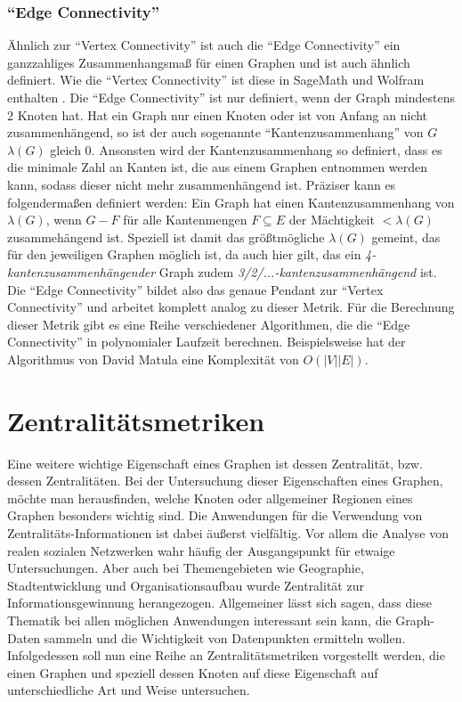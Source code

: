 \documentclass[a4paper,12pt,ngerman,chapterprefix=false,listof=totoc,bibliography=totoc]{scrreprt}
\begin{document}
\subsubsection*{"`Edge Connectivity"'}
{
Ähnlich zur "`Vertex Connectivity"' ist auch die "`Edge Connectivity"' ein ganzzahliges Zusammenhangsmaß für einen Graphen und ist auch ähnlich definiert. Wie die "`Vertex Connectivity"' ist diese in SageMath und Wolfram enthalten \cite{sagemath_graph_2020,wolfram_graph_2020}. Die "`Edge Connectivity"' ist nur definiert, wenn der Graph mindestens 2 Knoten hat. Hat ein Graph nur einen Knoten oder ist von Anfang an nicht zusammenhängend, so ist der auch sogenannte "`Kantenzusammenhang"' von \(G\) \(\lambda (G)\) gleich 0. Ansonsten wird der Kantenzusammenhang so definiert, dass es die minimale Zahl an Kanten ist, die aus einem Graphen entnommen werden kann, sodass dieser nicht mehr zusammenhängend ist. Präziser kann es folgendermaßen definiert werden: Ein Graph hat einen Kantenzusammenhang von \(\lambda (G)\), wenn \(G - F\) für alle Kantenmengen \(F\subseteq E\) der Mächtigkeit \(< \lambda (G)\) zusammehängend ist. Speziell ist damit das größtmögliche \(\lambda (G)\) gemeint, das für den jeweiligen Graphen möglich ist, da auch hier gilt, das ein \textit{4-kantenzusammenhängender} Graph zudem \textit{3/2/...-kantenzusammenhängend} ist. \cite{diestel_graphentheorie_2000} Die "`Edge Connectivity"' bildet also das genaue Pendant zur "`Vertex Connectivity"' und arbeitet komplett analog zu dieser Metrik. Für die Berechnung dieser Metrik gibt es eine Reihe verschiedener Algorithmen, die die "`Edge Connectivity"' in polynomialer Laufzeit berechnen. Beispielsweise hat der Algorithmus von David Matula eine Komplexität von \(O(|V||E|)\). \cite{matula_determining_1987}
}
\section{Zentralitätsmetriken}
{
Eine weitere wichtige Eigenschaft eines Graphen ist dessen Zentralität, bzw. dessen Zentralitäten. Bei der Untersuchung dieser Eigenschaften eines Graphen, möchte man herausfinden, welche Knoten oder allgemeiner Regionen eines Graphen besonders wichtig sind. Die Anwendungen für die Verwendung von Zentralitäts-Informationen ist dabei äußerst vielfältig. Vor allem die Analyse von realen sozialen Netzwerken wahr häufig der Ausgangspunkt für etwaige Untersuchungen. Aber auch bei Themengebieten wie Geographie, Stadtentwicklung und Organisationsaufbau wurde Zentralität zur Informationsgewinnung herangezogen. Allgemeiner lässt sich sagen, dass diese Thematik bei allen möglichen Anwendungen interessant sein kann, die Graph-Daten sammeln und die Wichtigkeit von Datenpunkten ermitteln wollen. Infolgedessen soll nun eine Reihe an Zentralitätsmetriken vorgestellt werden, die einen Graphen und speziell dessen Knoten auf diese Eigenschaft auf unterschiedliche Art und Weise untersuchen. \cite{freeman_centrality_1978}
}
\end{document}

